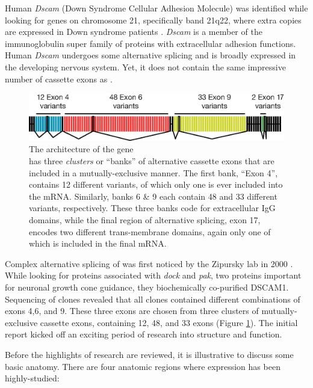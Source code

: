     Human \textit{Dscam} (Down Syndrome Cellular Adhesion Molecule) was identified while looking for genes on chromosome 21, specifically band 21q22, where extra copies are expressed in Down syndrome patients \citep{Yamakawa1998a}. \textit{Dscam} is a member of the immunoglobulin super family of proteins with extracellular adhesion functions. Human \textit{Dscam} undergoes some alternative splicing and is broadly expressed in the developing nervous system. Yet, it does not contain the same impressive number of cassette exons as \flies{} \dscam{}.

    \begin{figure} %
      \centering 
      \includegraphics{Figures/Intro/DscamArch.eps}
      \caption[The architecture of the \flies{} gene \dscam{}]
      {
        The architecture of the \flies{} gene \dscam{}\\[0.25cm]
        \dscam{} has three \textit{clusters} or ``banks'' of alternative cassette exons that are included in a mutually-exclusive manner. The first bank, ``Exon 4'', contains 12 different variants, of which only one is ever included into the mRNA. Similarly, banks 6 \& 9 each contain 48 and 33 different variants, respectively. These three banks code for extracellular IgG domains, while the final region of alternative splicing, exon 17, encodes two different trans-membrane domains, again only one of which is included in the final mRNA.
          }
        \label{Intro:fig:DscamArch}
        \end{figure}

    Complex alternative splicing of \dscam{} was first noticed by the Zipursky lab in 2000 \citep{Schmucker2000}. While looking for proteins associated with \textit{dock} and \textit{pak}, two proteins important for neuronal growth cone guidance, they biochemically co-purified DSCAM1. Sequencing of \dscam{} clones revealed that all clones contained different combinations of exons 4,6, and 9. These three exons are chosen from three clusters of mutually-exclusive cassette exons, containing 12, 48, and 33 exons (Figure \ref{Intro:fig:DscamArch}). The initial report kicked off an exciting period of research into \dscam{} structure and function.

    Before the highlights of \dscam{} research are reviewed, it is illustrative to discuss some basic \flies{} anatomy. There are four anatomic regions where \dscam{} expression has been highly-studied:

